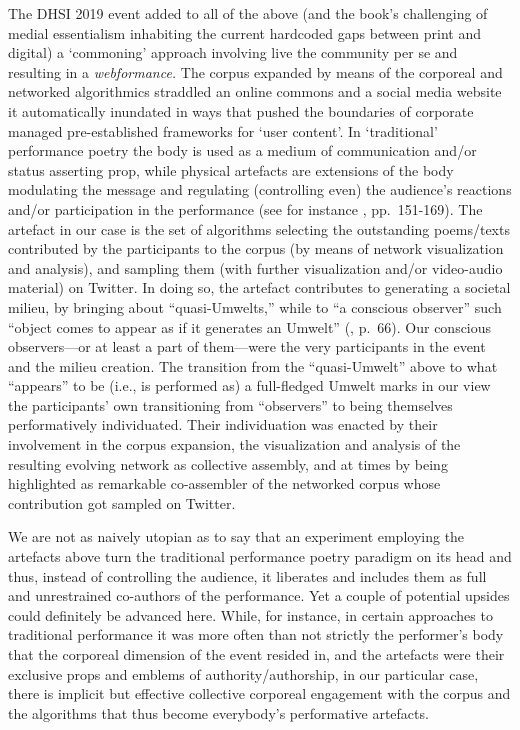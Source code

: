 The DHSI 2019 event added to all of the above (and the book's
challenging of medial essentialism inhabiting the current hardcoded gaps
between print and digital) a `commoning' approach involving live the
community per se and resulting in a \emph{webformance.} The corpus
expanded by means of the corporeal and networked algorithmics straddled
an online commons and a social media website it automatically inundated
in ways that pushed the boundaries of corporate managed pre-established
frameworks for `user content'. In `traditional' performance poetry the
body is used as a medium of communication and/or status asserting prop,
while physical artefacts are extensions of the body modulating the
message and regulating (controlling even) the audience's reactions
and/or participation in the performance (see for instance
\cite{novak2011live}, pp.~151-169). The artefact in our case is the set
of algorithms selecting the outstanding poems/texts contributed by the
participants to the corpus (by means of network visualization and
analysis), and sampling them (with further visualization and/or
video-audio material) on Twitter. In doing so, the artefact contributes
to generating a societal milieu, by bringing about ``quasi-Umwelts,''
while to ``a conscious observer'' such ``object comes to appear as if it
generates an Umwelt'' (\cite{schwarz2018umwelt}, p.~66). Our conscious
observers---or at least a part of them---were the very participants in
the event and the milieu creation. The transition from the
``quasi-Umwelt'' above to what ``appears'' to be (i.e., is performed as)
a full-fledged Umwelt marks in our view the participants' own
transitioning from ``observers'' to being themselves performatively
individuated. Their individuation was enacted by their involvement in
the corpus expansion, the visualization and analysis of the resulting
evolving network as collective assembly, and at times by being
highlighted as remarkable co-assembler of the networked corpus whose
contribution got sampled on Twitter.

We are not as naively utopian as to say that an experiment employing the
artefacts above turn the traditional performance poetry paradigm on its
head and thus, instead of controlling the audience, it liberates and
includes them as full and unrestrained co-authors of the performance.
Yet a couple of potential upsides could definitely be advanced here.
While, for instance, in certain approaches to traditional performance it
was more often than not strictly the performer's body that the corporeal
dimension of the event resided in, and the artefacts were their
exclusive props and emblems of authority/authorship, in our particular
case, there is implicit but effective collective corporeal engagement
with the corpus and the algorithms that thus become everybody's
performative artefacts.

